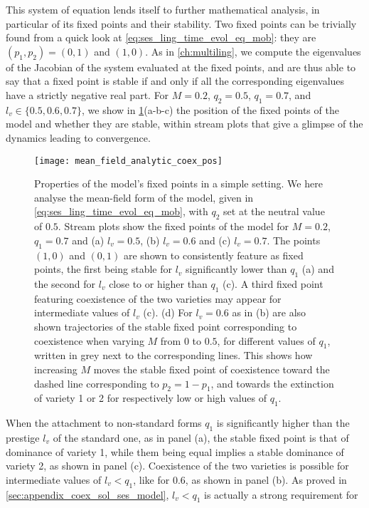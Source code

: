 \documentclass[../thesis.tex]{subfiles}
\begin{document}
This system of equation lends itself to further mathematical analysis, in particular of its
fixed points and their stability. Two fixed points can be trivially found from a quick
look at \cref{eq:ses_ling_time_evol_eq_mob}: they are $(p_1, p_2) = (0, 1)$ and $(1,
0)$. As in \cref{ch:multiling}, we compute the eigenvalues of the Jacobian of the system
evaluated at the fixed points, and are thus able to say that a fixed point is stable if
and only if all the corresponding eigenvalues have a strictly negative real part. For $M
= 0.2$, $q_2= 0.5$, $q_1 = 0.7$, and $l_v \in \{ 0.5, 0.6, 0.7\}$, we show in
\cref{fig:mean_field_analytic_coex_pos}(a-b-c) the position of the fixed points of the
model and whether they are stable, within stream plots that give a glimpse of the
dynamics leading to convergence.
\begin{figure}
\centering
  \texttt{[image: mean\_field\_analytic\_coex\_pos]}
  \caption{Properties of the model's fixed points in a simple setting. We here analyse
  the mean-field form of the model, given in \cref{eq:ses_ling_time_evol_eq_mob}, with
  $q_2$ set at the neutral value of $0.5$. Stream plots show the fixed points of the
  model for $M = 0.2$, $q_1 = 0.7$ and (a) $l_v = 0.5$, (b) $l_v = 0.6$ and (c) $l_v =
  0.7$. The points $(1, 0)$ and $(0, 1)$ are shown to consistently feature as fixed
  points, the first being stable for $l_v$ significantly lower than $q_1$ (a) and the
  second for $l_v$ close to or higher than $q_1$ (c). A third fixed point featuring
  coexistence of the two varieties may appear for intermediate values of $l_v$ (c). (d)
  For $l_v = 0.6$ as in (b) are also shown trajectories of the stable fixed point
  corresponding to coexistence when varying $M$ from $0$ to $0.5$, for different values
  of $q_1$, written in grey next to the corresponding lines. This shows how increasing
  $M$ moves the stable fixed point of coexistence toward the dashed line corresponding
  to $p_2 = 1 - p_1$, and towards the extinction of variety 1 or 2 for respectively low
  or high values of $q_1$.}
  \label{fig:mean_field_analytic_coex_pos}
\end{figure}
When the attachment to non-standard forms $q_1$ is significantly higher than the
prestige $l_v$ of the standard one, as in panel (a), the stable fixed point is that of
dominance of variety 1, while them being equal implies a stable dominance of variety 2,
as shown in panel (c). Coexistence of the two varieties is possible for intermediate
values of $l_v < q_1$, like for $0.6$, as shown in panel (b). As proved in
\cref{sec:appendix_coex_sol_ses_model}, $l_v < q_1$ is actually a strong requirement for
\end{document}
